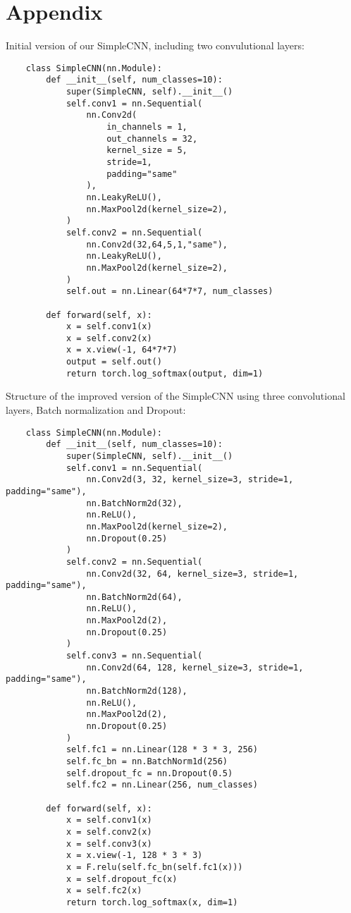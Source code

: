 \section{Appendix}

Initial version of our SimpleCNN, including two convulutional layers:\@

\begin{verbatim}
    class SimpleCNN(nn.Module):
        def __init__(self, num_classes=10):
            super(SimpleCNN, self).__init__()
            self.conv1 = nn.Sequential(
                nn.Conv2d(
                    in_channels = 1,
                    out_channels = 32,
                    kernel_size = 5,
                    stride=1,
                    padding="same"
                ),
                nn.LeakyReLU(),
                nn.MaxPool2d(kernel_size=2),
            )
            self.conv2 = nn.Sequential(
                nn.Conv2d(32,64,5,1,"same"),
                nn.LeakyReLU(),
                nn.MaxPool2d(kernel_size=2),
            )
            self.out = nn.Linear(64*7*7, num_classes)

        def forward(self, x):
            x = self.conv1(x)
            x = self.conv2(x)
            x = x.view(-1, 64*7*7)
            output = self.out()
            return torch.log_softmax(output, dim=1)
\end{verbatim}


Structure of the improved version of the SimpleCNN using three convolutional layers, Batch normalization and Dropout:\@

\begin{verbatim}
    class SimpleCNN(nn.Module):
        def __init__(self, num_classes=10):
            super(SimpleCNN, self).__init__()
            self.conv1 = nn.Sequential(
                nn.Conv2d(3, 32, kernel_size=3, stride=1, padding="same"),
                nn.BatchNorm2d(32),
                nn.ReLU(),
                nn.MaxPool2d(kernel_size=2),
                nn.Dropout(0.25)
            )
            self.conv2 = nn.Sequential(
                nn.Conv2d(32, 64, kernel_size=3, stride=1, padding="same"),
                nn.BatchNorm2d(64),            
                nn.ReLU(),
                nn.MaxPool2d(2),
                nn.Dropout(0.25)
            )
            self.conv3 = nn.Sequential(
                nn.Conv2d(64, 128, kernel_size=3, stride=1, padding="same"),
                nn.BatchNorm2d(128),
                nn.ReLU(),
                nn.MaxPool2d(2),
                nn.Dropout(0.25)
            )
            self.fc1 = nn.Linear(128 * 3 * 3, 256)
            self.fc_bn = nn.BatchNorm1d(256)
            self.dropout_fc = nn.Dropout(0.5)
            self.fc2 = nn.Linear(256, num_classes)
        
        def forward(self, x):
            x = self.conv1(x)
            x = self.conv2(x)
            x = self.conv3(x)
            x = x.view(-1, 128 * 3 * 3)
            x = F.relu(self.fc_bn(self.fc1(x)))
            x = self.dropout_fc(x)
            x = self.fc2(x)
            return torch.log_softmax(x, dim=1)
\end{verbatim}
    